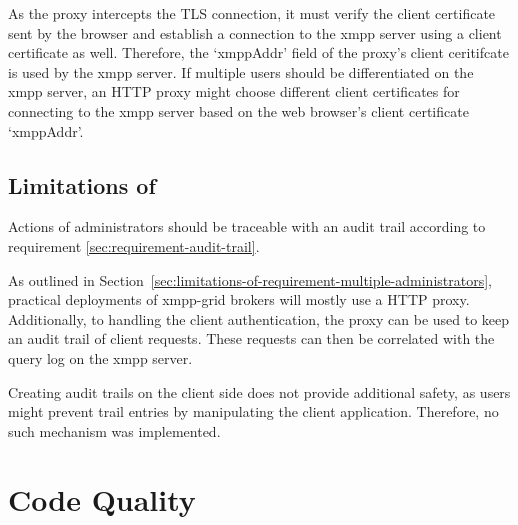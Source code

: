 As the proxy intercepts the TLS connection, it must verify the client certificate sent by the browser and establish a connection to the \gls{xmpp} server using a client certificate as well.
Therefore, the `xmppAddr' field of the proxy's client ceritifcate is used by the \gls{xmpp} server.
If multiple users should be differentiated on the \gls{xmpp} server, an HTTP proxy might choose different client certificates for connecting to the \gls{xmpp} server based on the web browser's client certificate `xmppAddr'.


\subsection{Limitations of \emph{}}

Actions of administrators should be traceable with an audit trail according to requirement \ref{sec:requirement-audit-trail}.

As outlined in Section~\ref{sec:limitations-of-requirement-multiple-administrators}, practical deployments of \gls{xmpp-grid} \glspl{broker} will mostly use a HTTP proxy.
Additionally, to handling the client authentication, the proxy can be used to keep an audit trail of client requests.
These requests can then be correlated with the query log on the \gls{xmpp} server.

Creating audit trails on the client side does not provide additional safety, as users might prevent trail entries by manipulating the client application.
Therefore, no such mechanism was implemented.



\section{Code Quality}


